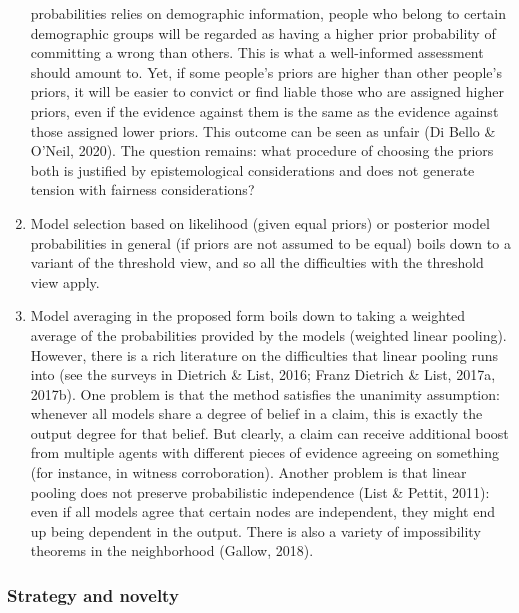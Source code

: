 \documentclass[11pt,dvipsnames,enabledeprecatedfontcommands]{scrartcl}
\begin{document}
\begin{enumerate}
  probabilities relies on demographic information, people who belong to
  certain demographic groups will be regarded as having a higher prior
  probability of committing a wrong than others. This is what a
  well-informed assessment should amount to. Yet, if some people's
  priors are higher than other people's priors, it will be easier to
  convict or find liable those who are assigned higher priors, even if
  the evidence against them is the same as the evidence against those
  assigned lower priors. This outcome can be seen as unfair (Di Bello \&
  O'Neil, 2020). The question remains: what procedure of choosing the
  priors both is justified by epistemological considerations and does
  not generate tension with fairness considerations?
\item
  Model selection based on likelihood (given equal priors) or posterior
  model probabilities in general (if priors are not assumed to be equal)
  boils down to a variant of the threshold view, and so all the
  difficulties with the threshold view apply.
\item
  Model averaging in the proposed form boils down to taking a weighted
  average of the probabilities provided by the models (weighted linear
  pooling). However, there is a rich literature on the difficulties that
  linear pooling runs into (see the surveys in Dietrich \& List, 2016;
  Franz Dietrich \& List, 2017a, 2017b). One problem is that the method
  satisfies the unanimity assumption: whenever all models share a degree
  of belief in a claim, this is exactly the output degree for that
  belief. But clearly, a claim can receive additional boost from
  multiple agents with different pieces of evidence agreeing on
  something (for instance, in witness corroboration). Another problem is
  that linear pooling does not preserve probabilistic independence (List
  \& Pettit, 2011): even if all models agree that certain nodes are
  independent, they might end up being dependent in the output. There is
  also a variety of impossibility theorems in the neighborhood (Gallow,
  2018).\\
   
\end{enumerate}

\subsubsection{Strategy and novelty}\label{strategy-and-novelty}
\end{document}
